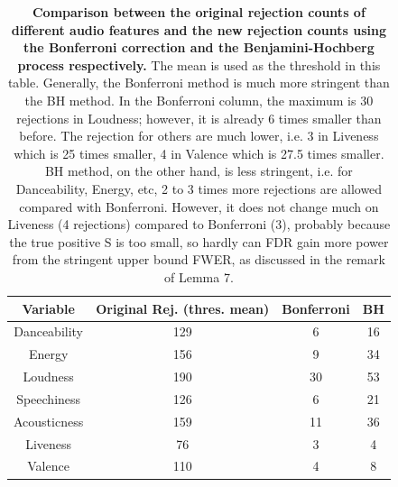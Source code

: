 \documentclass[12pt]{article}
\theoremstyle{plain}
\theoremstyle{definition}
\theoremstyle{remark}
\begin{document}
\begin{table}[h!]
    \centering
    \begin{tabular}{|c|c|c|c|}
       \hline
       Variable & Original Rej. (thres. mean) & Bonferroni & BH \\
       \hline
        Danceability &129 &6&16\\
        \hline
        Energy &156 &9&34\\
        \hline
        Loudness &190 &30&53\\
        \hline
        Speechiness &126 &6&21\\
        \hline
        Acousticness &159 &11&36\\
        \hline
        Liveness & 76&3&4\\
        \hline
        Valence & 110&4&8\\
        \hline
    \end{tabular}
    \caption{\textbf{Comparison between the original rejection counts of different audio features and the new rejection counts using the Bonferroni correction and the Benjamini-Hochberg process respectively.} The mean is used as the threshold in this table. Generally, the Bonferroni method is much more stringent than the BH method. In the Bonferroni column, the maximum is 30 rejections in Loudness; however, it is already 6 times smaller than before. The rejection for others are much lower, i.e. 3 in Liveness which is 25 times smaller, 4 in Valence which is 27.5 times smaller. BH method, on the other hand, is less stringent, i.e. for Danceability, Energy, etc, 2 to 3 times more rejections are allowed compared with Bonferroni. However, it does not change much on Liveness (4 rejections) compared to Bonferroni (3), probably because the true positive S is too small, so hardly can FDR gain more power from the stringent upper bound FWER, as discussed in the remark of Lemma 7. }
    \label{table 5}
\end{table}
\end{document}
